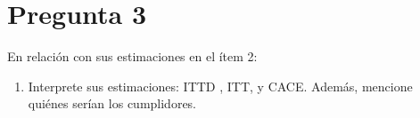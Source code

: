 \documentclass[
  12pt,
  a4paper,
]{article}
\providecommand{\tightlist}{%
  \setlength{\itemsep}{0pt}\setlength{\parskip}{0pt}}
\begin{document}
\begin{table}[h!]
\begin{center}
\caption{\label{tab:table2} Modelos de VI con efectos fijos para apoyo a partidos de extrema derecha en base a Pepinsky et al. (2023)}
\label{table:coefficients}
\end{center}
\end{table}

\hypertarget{pregunta-3}{%
\section{Pregunta 3}\label{pregunta-3}}

En relación con sus estimaciones en el ítem 2:

\begin{enumerate}
\def\labelenumi{\alph{enumi})}
\tightlist
\item
  Interprete sus estimaciones: ITTD , ITT, y CACE. Además, mencione quiénes serían los cumplidores.
\end{enumerate}
\end{document}
